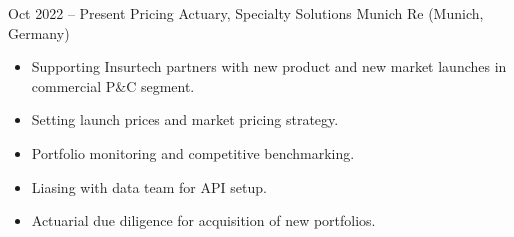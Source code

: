\documentclass[a4paper,]{fortysecondscv}
\begin{document}
\begin{cvtable}%

    \vspace{\topsep}
    \cvitem
    {Oct 2022 -- Present}
    {Pricing Actuary, Specialty Solutions}
    {Munich Re (Munich, Germany)}
    {
        \vspace{-\topsep}
        \begin{itemize}[nosep, leftmargin=0pt] %
            \item Supporting Insurtech partners with new product and new market launches in commercial P\&C segment.
            \item Setting launch prices and market pricing strategy.
            \item Portfolio monitoring and competitive benchmarking.
            \item Liasing with data team for API setup.
            \item Actuarial due diligence for acquisition of new portfolios.
        \end{itemize}
    }


\end{cvtable}
\end{document}
